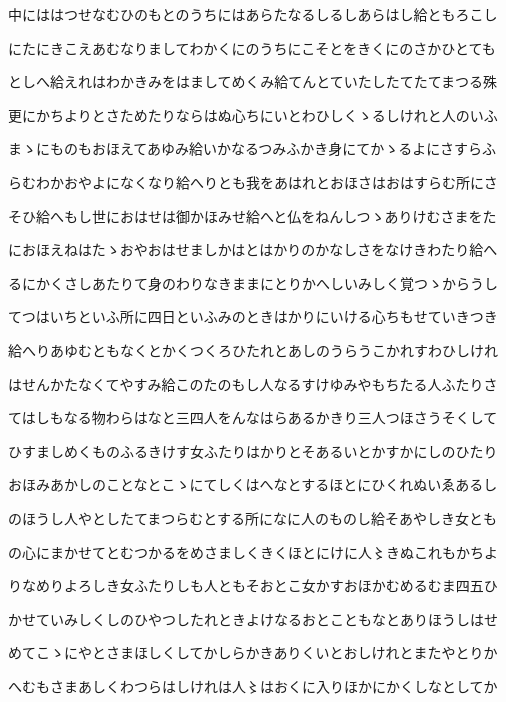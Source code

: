 \documentclass[a4paper,11pt,landscape]{ltjtarticle}
\begin{document}
\par\medskip
中にははつせなむひのもとのうちにはあらたなるしるしあらはし給ともろこし
\par\medskip
にたにきこえあむなりましてわかくにのうちにこそとをきくにのさかひとても
\par\medskip
としへ給えれはわかきみをはましてめくみ給てんとていたしたてたてまつる殊
\par\medskip
更にかちよりとさためたりならはぬ心ちにいとわひしくゝるしけれと人のいふ
\par\medskip
まゝにものもおほえてあゆみ給いかなるつみふかき身にてかゝるよにさすらふ
\par\medskip
らむわかおやよになくなり給へりとも我をあはれとおほさはおはすらむ所にさ
\par\medskip
そひ給へもし世におはせは御かほみせ給へと仏をねんしつゝありけむさまをた
\par\medskip
におほえねはたゝおやおはせましかはとはかりのかなしさをなけきわたり給へ
\par\medskip
るにかくさしあたりて身のわりなきままにとりかへしいみしく覚つゝからうし
\par\medskip
てつはいちといふ所に四日といふみのときはかりにいける心ちもせていきつき
\par\medskip
給へりあゆむともなくとかくつくろひたれとあしのうらうこかれすわひしけれ
\par\medskip
はせんかたなくてやすみ給このたのもし人なるすけゆみやもちたる人ふたりさ
\par\medskip
てはしもなる物わらはなと三四人をんなはらあるかきり三人つほさうそくして
\par\medskip
ひすましめくものふるきけす女ふたりはかりとそあるいとかすかにしのひたり
\par\medskip
おほみあかしのことなとこゝにてしくはへなとするほとにひくれぬいゑあるし
\par\medskip
のほうし人やとしたてまつらむとする所になに人のものし給そあやしき女とも
\par\medskip
の心にまかせてとむつかるをめさましくきくほとにけに人〻きぬこれもかちよ
\par\medskip
りなめりよろしき女ふたりしも人ともそおとこ女かすおほかむめるむま四五ひ
\par\medskip
かせていみしくしのひやつしたれときよけなるおとこともなとありほうしはせ
\par\medskip
めてこゝにやとさまほしくしてかしらかきありくいとおしけれとまたやとりか
\par\medskip
へむもさまあしくわつらはしけれは人〻はおくに入りほかにかくしなとしてか
\end{document}
